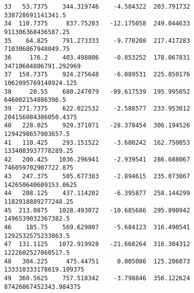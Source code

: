 \documentclass[11pt]{article}
\begin{document}
\begin{tcolorbox}[breakable, size=fbox, boxrule=.5pt, pad at break*=1mm, opacityfill=0]
\begin{Verbatim}[commandchars=\\\{\}]
33   53.7375    344.319746    -4.584322  203.791732       338728691141341.5
34  110.7375     837.75203   -12.175058  249.044633      911306368436587.25
35    64.825    791.273333    -9.770208  217.417283      710306867948049.75
36     176.2    403.498806    -0.853252  178.067831   34710604806791.292969
37  158.7375    924.275648    -6.089531  225.850176    1062095769148924.125
38     20.55    680.247079   -99.617539  195.995052       646002154886396.5
39  271.7375    622.022532    -2.588577  233.953012    204156084386050.4375
40   228.025    929.371071   -28.378454  306.194526      1294298657903657.5
41   110.425    293.151522    -3.680242  162.750053     1334083937778289.25
42   200.425   1036.296941    -2.939541  286.688067     746059702907722.875
43   247.375    505.677383    -2.894615  235.073067    142650640609153.0625
44   208.125    437.114202    -6.395877  258.144299     1182918889277248.25
45  213.0875   1028.493072   -10.685686  295.890942      1496539032367382.5
46    185.75    569.629807    -5.684123  316.490541      1292532575233863.5
47  131.1125   1072.919928   -21.668264  316.304312      1222602527060517.5
48   304.225     475.44751     0.005086  125.206073  133310333178619.109375
49  360.5625    757.518342    -3.798846  356.122624   87426067452343.984375


\end{Verbatim}
\end{tcolorbox}
\end{document}
